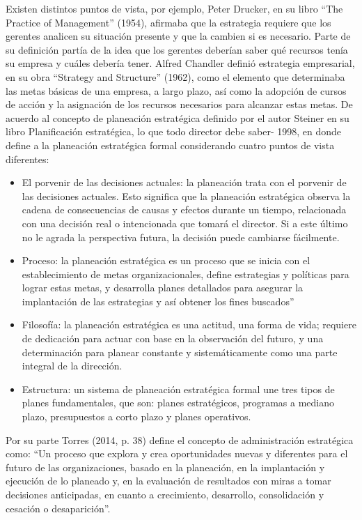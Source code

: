 Existen distintos puntos de vista, por ejemplo, Peter Drucker, en su libro “The Practice of Management” (1954), afirmaba que la estrategia requiere que los gerentes analicen su situación presente y que la cambien si es necesario. Parte de su definición partía de la idea que los gerentes deberían saber qué recursos tenía su empresa y cuáles debería tener.
Alfred Chandler definió estrategia empresarial, en su obra “Strategy and Structure” (1962), como el elemento que determinaba las metas básicas de una empresa, a largo plazo, así como la adopción de cursos de acción y la asignación de los recursos necesarios para alcanzar estas metas.
De acuerdo al concepto de planeación estratégica definido por el autor Steiner en su libro Planificación estratégica, lo que todo director debe saber- 1998, en donde define a la planeación estratégica formal considerando cuatro puntos de vista diferentes:
\begin{itemize}
	\item El porvenir de las decisiones actuales: la planeación trata con el porvenir de las decisiones actuales. Esto significa que la planeación estratégica observa la cadena de consecuencias de causas y efectos durante un tiempo, relacionada con una decisión real o intencionada que tomará el director. Si a este último no le agrada la perspectiva futura, la decisión puede cambiarse fácilmente. 
	\item Proceso: la planeación estratégica es un proceso que se inicia con el establecimiento de metas organizacionales, define estrategias y políticas para lograr estas metas, y desarrolla planes detallados para asegurar la implantación de las estrategias y así obtener los fines buscados”
	\item Filosofía: la planeación estratégica es una actitud, una forma de vida; requiere de dedicación para actuar con base en la observación del futuro, y una determinación para planear constante y sistemáticamente como una parte integral de la dirección.
	 \item Estructura: un sistema de planeación estratégica formal une tres tipos de planes fundamentales, que son: planes estratégicos, programas a mediano plazo, presupuestos a corto plazo y planes operativos.
\end{itemize}

Por su parte Torres (2014, p. 38) define el concepto de administración estratégica como: “Un proceso que explora y crea oportunidades nuevas y diferentes para el futuro de las organizaciones, basado en la planeación, en la implantación y ejecución de lo planeado y, en la evaluación de resultados con miras a tomar decisiones anticipadas, en cuanto a crecimiento, desarrollo, consolidación y cesación o desaparición”.

